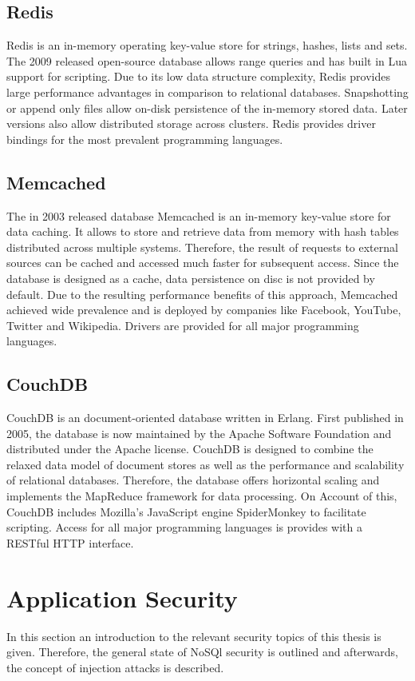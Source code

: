 \subsection{Redis}
Redis is an in-memory operating key-value store for strings, hashes, lists and sets. The 2009 released open-source database allows range queries and has built in Lua support for scripting. Due to its low data structure complexity, Redis provides large performance advantages in comparison to relational databases. Snapshotting or append only files allow on-disk persistence of the in-memory stored data. Later versions also allow distributed storage across clusters. Redis provides driver bindings for the most prevalent programming languages.

\subsection{Memcached}
The in 2003 released database Memcached is an in-memory key-value store for data caching. It allows to store and retrieve data from memory with hash tables distributed across multiple systems. Therefore, the result of requests to external sources can be cached and accessed much faster for subsequent access. Since the database is designed as a cache, data persistence on disc is not provided by default. Due to the resulting performance benefits of this approach, Memcached achieved wide prevalence and is deployed by companies like Facebook, YouTube, Twitter and Wikipedia. Drivers are provided for all major programming languages.


\subsection{CouchDB}
CouchDB is an document-oriented database written in Erlang. First published in 2005, the database is now maintained by the Apache Software Foundation and distributed under the Apache license. CouchDB is designed to combine the relaxed data model of document stores as well as the performance and scalability of relational databases. Therefore, the database offers horizontal scaling and implements the MapReduce framework for data processing. On Account of this, CouchDB includes Mozilla's JavaScript engine SpiderMonkey to facilitate scripting. Access for all major programming languages is provides with a RESTful HTTP interface. 

\section{Application Security}
In this section an introduction to the relevant security topics of this thesis is given. Therefore, the general state of NoSQl security is outlined and afterwards, the concept of injection attacks is described.
